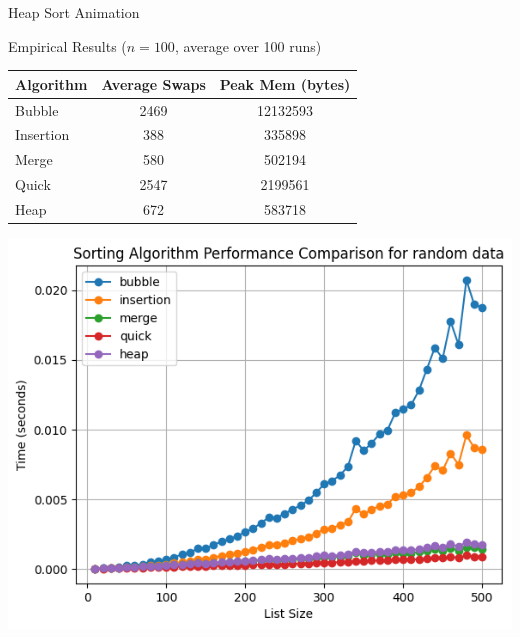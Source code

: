 \documentclass[aspectratio=169]{beamer}
\begin{document}
\begin{frame}{Heap Sort Animation}
  \vspace*{-2cm}
  \centering
\end{frame}

\begin{frame}{Empirical Results ($n=100$, average over 100 runs)}
  \begin{table}[ht]
  \begin{tabular}{l c c}
    \toprule
    Algorithm & Average Swaps & Peak Mem (bytes) \\
    \midrule
    Bubble    & 2469 & 12132593 \\
    Insertion & 388 & 335898 \\
    Merge     & 580  & 502194 \\
    Quick     & 2547  & 2199561 \\
    Heap      & 672  & 583718  \\
    \bottomrule
  \end{tabular}
  \end{table}
\end{frame}

\begin{frame}{}
    \vspace*{-2cm}
  \includegraphics[height=1.3\textheight]{graphs/random.png}\\
\end{frame}
\end{document}
